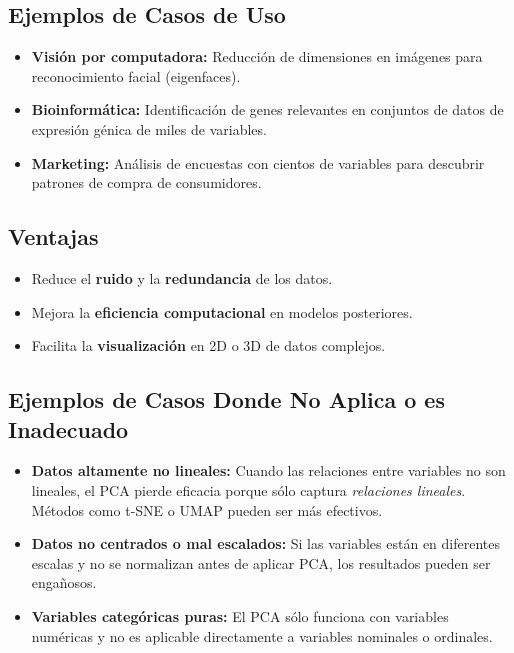 \documentclass[12pt]{article}
\begin{document}
        \subsection*{Ejemplos de Casos de Uso}
        \begin{itemize}
                \item \textbf{Visión por computadora:} Reducción de dimensiones en imágenes para reconocimiento facial (eigenfaces).
                \item \textbf{Bioinformática:} Identificación de genes relevantes en conjuntos de datos de expresión génica de miles de variables.
                \item \textbf{Marketing:} Análisis de encuestas con cientos de variables para descubrir patrones de compra de consumidores.
        \end{itemize}
        
        \subsection*{Ventajas}
        \begin{itemize}
                \item Reduce el \textbf{ruido} y la \textbf{redundancia} de los datos.
                \item Mejora la \textbf{eficiencia computacional} en modelos posteriores.
                \item Facilita la \textbf{visualización} en 2D o 3D de datos complejos.
        \end{itemize}
        
        \subsection*{Ejemplos de Casos Donde No Aplica o es Inadecuado}
        \begin{itemize}
                \item \textbf{Datos altamente no lineales:} Cuando las relaciones entre variables no son lineales, el PCA pierde eficacia porque sólo captura \emph{relaciones lineales}. Métodos como t-SNE o UMAP pueden ser más efectivos.
                \item \textbf{Datos no centrados o mal escalados:} Si las variables están en diferentes escalas y no se normalizan antes de aplicar PCA, los resultados pueden ser engañosos.
                \item \textbf{Variables categóricas puras:} El PCA sólo funciona con variables numéricas y no es aplicable directamente a variables nominales o ordinales.
        \end{itemize}
        
\end{document}

